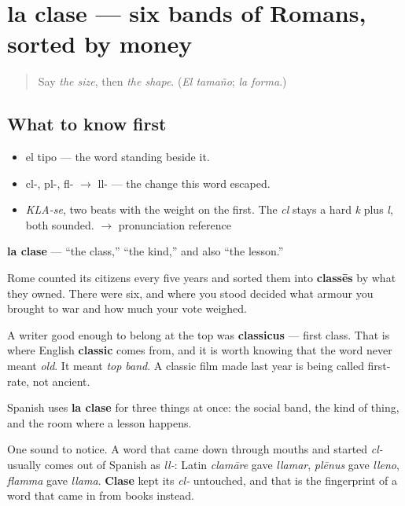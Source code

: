 \section[la clase]{la clase — six bands of Romans, sorted by money}

\label{lesson:ES-C358-clase}



\begin{quote}
Say \emph{the size}, then \emph{the shape}. (\emph{El tamaño}; \emph{la forma}.)
\end{quote}

\subsection*{What to know first}
\begin{itemize}
\raggedright
  \item el tipo — the word standing beside it.
  \item cl-, pl-, fl- $\to$ ll- — the change this word escaped.
\end{itemize}

\begin{sounds}
\begin{itemize}
\raggedright
  \item \emph{KLA-se}, two beats with the weight on the first. The \emph{cl} stays a hard \emph{k} plus \emph{l}, both sounded. $\to$ pronunciation reference
\end{itemize}
\end{sounds}

\begin{cousinweb}
\textbf{la clase} — \textquotedblleft{}the class,\textquotedblright{} \textquotedblleft{}the kind,\textquotedblright{} and also \textquotedblleft{}the lesson.\textquotedblright{}

Rome counted its citizens every five years and sorted them into \textbf{classēs} by what they owned. There were six, and where you stood decided what armour you brought to war and how much your vote weighed.

A writer good enough to belong at the top was \textbf{classicus} — first class. That is where English \textbf{classic} comes from, and it is worth knowing that the word never meant \emph{old}. It meant \emph{top band}. A classic film made last year is being called first-rate, not ancient.

Spanish uses \textbf{la clase} for three things at once: the social band, the kind of thing, and the room where a lesson happens.

One sound to notice. A word that came down through mouths and started \emph{cl-} usually comes out of Spanish as \emph{ll-}: Latin \emph{clamāre} gave \emph{llamar}, \emph{plēnus} gave \emph{lleno}, \emph{flamma} gave \emph{llama}. \textbf{Clase} kept its \emph{cl-} untouched, and that is the fingerprint of a word that came in from books instead.
\end{cousinweb}

